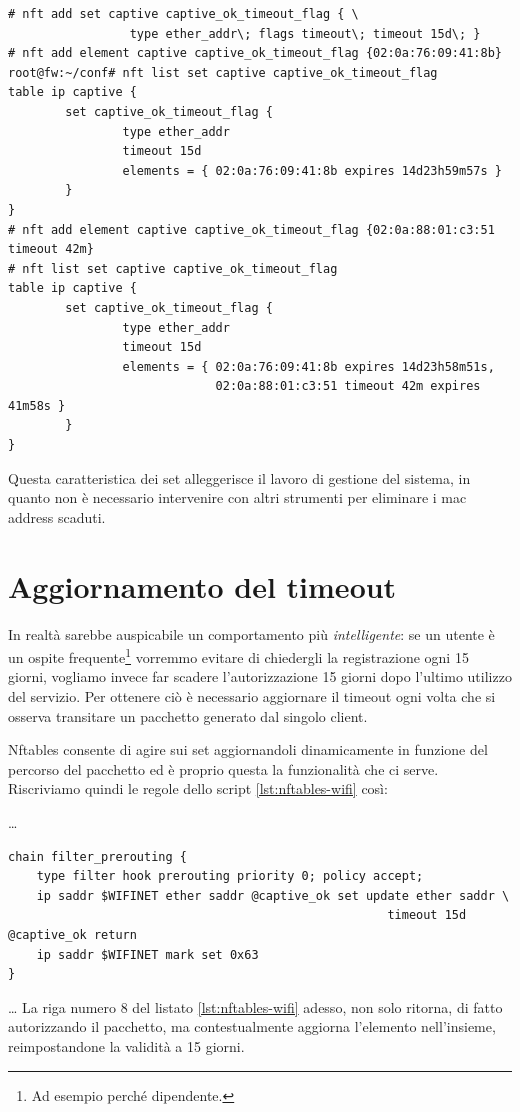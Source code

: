 \begin{lstlisting}[style=customb]
# nft add set captive captive_ok_timeout_flag { \
                 type ether_addr\; flags timeout\; timeout 15d\; }
# nft add element captive captive_ok_timeout_flag {02:0a:76:09:41:8b}
root@fw:~/conf# nft list set captive captive_ok_timeout_flag
table ip captive {
        set captive_ok_timeout_flag {
                type ether_addr
                timeout 15d
                elements = { 02:0a:76:09:41:8b expires 14d23h59m57s }
        }
}
# nft add element captive captive_ok_timeout_flag {02:0a:88:01:c3:51 timeout 42m}
# nft list set captive captive_ok_timeout_flag
table ip captive {
        set captive_ok_timeout_flag {
                type ether_addr
                timeout 15d
                elements = { 02:0a:76:09:41:8b expires 14d23h58m51s,
                             02:0a:88:01:c3:51 timeout 42m expires 41m58s }
        }
}
\end{lstlisting}
Questa caratteristica dei set alleggerisce il lavoro di gestione del sistema, in quanto non è necessario intervenire con altri
strumenti per eliminare i mac address scaduti.
\section{Aggiornamento del timeout}
In realt\`a sarebbe auspicabile un comportamento pi\`u {\em intelligente}: se un utente \`e 
un ospite frequente\footnote{Ad esempio perch\'e dipendente.} vorremmo evitare
di chiedergli la registrazione ogni 15 giorni,
vogliamo invece far scadere l'autorizzazione 15 giorni dopo l'ultimo utilizzo del servizio.
Per ottenere ci\`o \`e necessario aggiornare il timeout
ogni volta che si osserva transitare un pacchetto generato dal singolo client.

Nftables consente di agire sui set aggiornandoli dinamicamente in funzione del
percorso del pacchetto ed \`e proprio questa la funzionalit\`a che ci serve.
Riscriviamo quindi le regole dello script \ref{lst:nftables-wifi} cos\`i:

\noindent\ldots
\begin{lstlisting}[style=customc,firstnumber=6]
chain filter_prerouting {
    type filter hook prerouting priority 0; policy accept;
    ip saddr $WIFINET ether saddr @captive_ok set update ether saddr \
                                                     timeout 15d @captive_ok return
    ip saddr $WIFINET mark set 0x63
}
\end{lstlisting}
\noindent\ldots
La riga numero 8 del listato \ref{lst:nftables-wifi} adesso, non solo ritorna,
di fatto autorizzando il pacchetto, ma contestualmente aggiorna l'elemento
nell'insieme, reimpostandone la validit\`a a 15 giorni.

